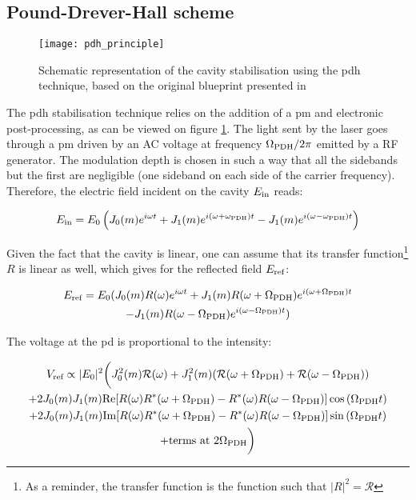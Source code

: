 
\subsection{Pound-Drever-Hall scheme}

\begin{figure}[h]
	\centering
	\texttt{[image: pdh\_principle]}
	\caption{Schematic representation of the cavity stabilisation using the \gls{pdh} technique, based on the original blueprint presented in \cite{drever1983laser}}
	\label{pdh_principle}
\end{figure}

The \gls{pdh} stabilisation technique relies on the addition of a \gls{pm} and electronic post-processing, as can be viewed on figure \ref{pdh_principle}. The light sent by the laser goes through a \gls{pm} driven by an AC voltage at frequency $\Omega_{\text{PDH}}/2\pi$ emitted by a RF generator. The modulation depth is chosen in such a way that all the sidebands but the first are negligible (one sideband on each side of the carrier frequency). Therefore, the electric field incident on the cavity $E_{\text{in}}$ reads:

\begin{equation}
	E_{\text{in}} = E_0 \left(J_0(m) e^{i\omega t} + J_1(m)e^{i(\omega +\omega_{\text{PDH}})t} - J_1(m)e^{i(\omega -\omega_{\text{PDH}})t}  \right)
\end{equation}

Given the fact that the cavity is linear, one can assume that its transfer function\footnote{As a reminder, the transfer function is the function such that $|R|^2=\mathcal{R}$} $R$ is linear as well, which gives for the reflected field $E_{\text{ref}}$:

\begin{gather}
	E_{\text{ref}} = E_0 ( J_0(m) R(\omega) e^{i \omega t} + J_1(m) R(\omega+\Omega_{\text{PDH}}) e^{i (\omega+\Omega_{\text{PDH}}) t} \nonumber \\
	- J_1(m) R(\omega-\Omega_{\text{PDH}}) e^{i (\omega-\Omega_{\text{PDH}}) t} )
\end{gather}

The voltage at the \gls{pd} is proportional to the intensity:

\begin{gather}
	V_{\text{ref}} \propto |E_0|^2 \bigg( J_0^2(m) \mathcal{R}(\omega) + J_1^2(m) (\mathcal{R}(\omega+\Omega_{\text{PDH}}) + \mathcal{R}(\omega-\Omega_{\text{PDH}})) \nonumber \\
	+ 2 J_0(m)J_1(m) \text{Re}[R(\omega)R^*(\omega+\Omega_{\text{PDH}})-R^*(\omega)R(\omega-\Omega_{\text{PDH}})] \cos{(\Omega_{\text{PDH}} t)} \nonumber \\
	+ 2 J_0(m)J_1(m) \text{Im}[R(\omega)R^*(\omega+\Omega_{\text{PDH}})-R^*(\omega)R(\omega-\Omega_{\text{PDH}})] \sin{(\Omega_{\text{PDH}} t)} \nonumber \\
	+ \text{terms at } 2\Omega_{\text{PDH}} \bigg)
\end{gather}

